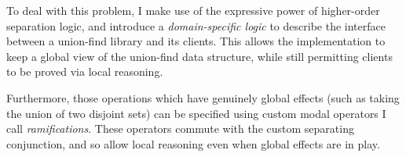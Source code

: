 To deal with this problem, I make use of the expressive power of
higher-order separation logic, and introduce a \emph{domain-specific
  logic} to describe the interface between a union-find library and
its clients. This allows the implementation to keep a global view of
the union-find data structure, while still permitting clients to be
proved via local reasoning.

Furthermore, those operations which have genuinely global effects
(such as taking the union of two disjoint sets) can be specified using
custom modal operators I call \emph{ramifications}. These operators
commute with the custom separating conjunction, and so allow local
reasoning even when global effects are in play.

% 
% 
% 
% 


